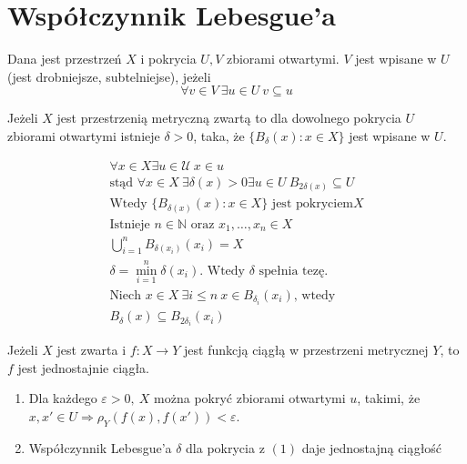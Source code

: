 \section{Współczynnik Lebesgue'a}
\begin{df} 
    Dana jest przestrzeń $X$ i pokrycia $U, V$ zbiorami otwartymi. $V$ jest wpisane w $U$ (jest drobniejsze, 
    subtelniejse), jeżeli 
    \[ \forall v \in V \ \exists u \in U \ v \subseteq u \]
\end{df} 
\begin{tw} 
    Jeżeli $X$ jest przestrzenią metryczną zwartą to dla dowolnego pokrycia $U$ zbiorami otwartymi 
    istnieje $\delta > 0$, taka, że $\{ B_\delta(x) : x \in X\}$ jest wpisane w $U$. 
\end{tw} 
\begin{dd} 
    \begin{gather*}
        \forall x \in X \exists u \in \mathcal{U} \ x \in u \\ 
        \text{stąd } \forall x \in X \ \exists \delta (x) > 0 \exists u \in U \ B_{2\delta (x)} \subseteq U \\
        \text{Wtedy } \{ B_{\delta (x)} (x) : x \in X \} \text{ jest pokryciem} X \\
        \text{Istnieje } n \in \mathbb{N} \text{ oraz } x_1,\ldots,x_n \in X \\ 
        \bigcup_{i=1}^n B_{\delta (x_i)} (x_i) = X \\ 
        \delta = \min_{i=1}^n \delta(x_i). \text{ Wtedy } \delta \text{ spełnia tezę}. \\ 
        \text{Niech } x \in X \ \exists i \le n \ x \in B_{\delta_i} (x_i) \text{, wtedy} \\ 
        B_\delta (x) \subseteq B_{2\delta_i} (x_i)
    \end{gather*} 
\end{dd} 
\begin{prz} 
    Jeżeli $X$ jest zwarta i $f : X \to Y$ jest funkcją ciągłą w przestrzeni metrycznej $Y$, to $f$ 
    jest jednostajnie ciągła. 
    \begin{enumerate}[(1)]
        \item Dla każdego $\varepsilon > 0, \ X $ można pokryć zbiorami otwartymi $u$, takimi, że $x,x' \in U 
            \Rightarrow \rho_Y (f(x),f(x')) < \varepsilon$.
        \item Współczynnik Lebesgue'a $\delta$ dla pokrycia z $(1)$ daje jednostajną ciągłość
    \end{enumerate} 
\end{prz}
